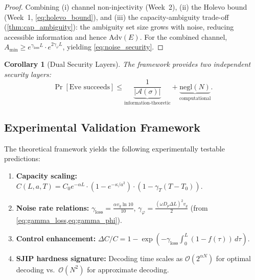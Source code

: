 \documentclass[12pt,a4paper]{article}
\theoremstyle{definition}
\theoremstyle{plain}
\newtheorem{corollary}[theorem]{Corollary}
\begin{document}
\begin{proof}
Combining (i) channel non-injectivity (Week~2), (ii) the Holevo bound (Week~1,
\cref{eq:holevo_bound}), and (iii) the capacity-ambiguity trade-off (\cref{thm:cap_ambiguity}):
the ambiguity set size grows with noise, reducing accessible information and hence
$\mathrm{Adv}(E)$. For the combined channel, $A_{\min}\ge e^{\gamma_{\mathrm{loss}}L}\cdot e^{2\gamma_\varphi L}$,
yielding \cref{eq:noise_security}.
\end{proof}

\begin{corollary}[Dual Security Layers]
The framework provides two independent security layers:
\begin{equation}
\Pr[\text{Eve succeeds}]\le\underbrace{\frac{1}{|\mathcal{A}(\sigma)|}}_{\text{information-theoretic}}+\underbrace{\mathrm{negl}(N)}_{\text{computational}}.
\label{eq:dual_security}
\end{equation}
\end{corollary}

\subsection{Experimental Validation Framework}

The theoretical framework yields the following experimentally testable predictions:

\begin{enumerate}[leftmargin=*, label=(\arabic*)]
  \item \textbf{Capacity scaling:} $C(L,a,T)=C_0 e^{-\alpha L}\cdot(1-e^{-\kappa/a^2})\cdot(1-\gamma_T(T-T_0))$.
  \item \textbf{Noise rate relations:} $\gamma_{\mathrm{loss}}=\frac{\alpha v_g\ln10}{10}$,
    $\gamma_\varphi=\frac{(\omega D_p\Delta L)^2 v_g}{2}$ (from \cref{eq:gamma_loss,eq:gamma_phi}).
  \item \textbf{Control enhancement:} $\Delta C/C=1-\exp(-\gamma_{\mathrm{loss}}\int_0^L(1-f(\tau))\,d\tau)$.
  \item \textbf{SJIP hardness signature:} Decoding time scales as $\mathcal{O}(2^{\alpha N})$
    for optimal decoding vs.\ $\mathcal{O}(N^2)$ for approximate decoding.
\end{enumerate}
\end{document}
